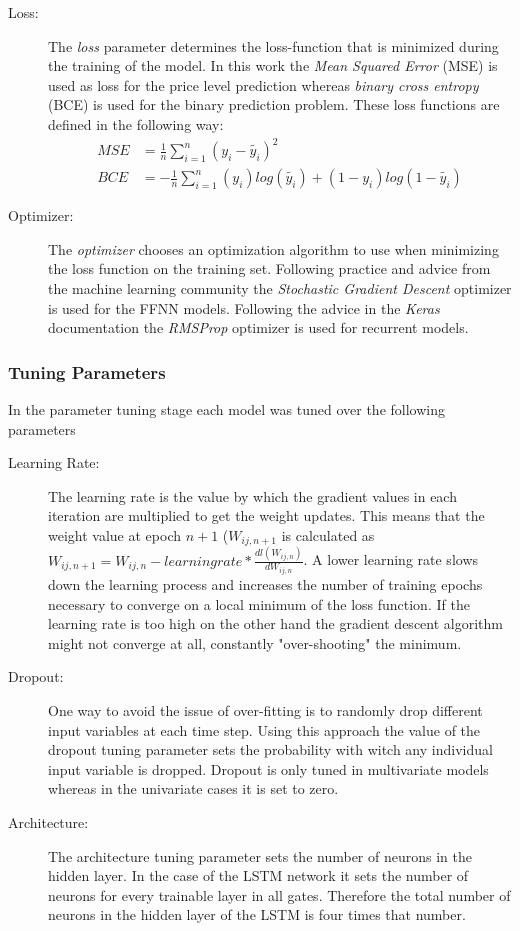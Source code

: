 \begin{description}
\item[Loss:] The \textit{loss} parameter determines the loss-function that is minimized during the training of the model. In this work the \textit{Mean Squared Error} (MSE) is used as loss for the price level prediction whereas \textit{binary cross entropy} (BCE) is used for the binary prediction problem. These loss functions are defined in the following way: \begin{align*}
MSE &= \frac{1}{n}\sum_{i=1}^{n}(y_i - \tilde{y_i})^2 \\
BCE &= -\frac{1}{n}\sum_{i=1}^{n}(y_i)log(\tilde{y_i}) + (1-y_i)log(1-\tilde{y_i})
\end{align*}

\item[Optimizer:] The \textit{optimizer} chooses an optimization algorithm to use when minimizing the loss function on the training set. Following practice and advice from the machine learning community the \textit{Stochastic Gradient Descent} optimizer is used for the FFNN models. Following the advice in the \textit{Keras} documentation the \textit{RMSProp} optimizer is used for recurrent models.
\end{description}
\subsubsection{Tuning Parameters}
In the parameter tuning stage each model was tuned over the following parameters
\begin{description}
\item[Learning Rate:] The learning rate is the value by which the gradient values in each iteration are multiplied to get the weight updates. This means that the weight value at epoch $n+1$ ($W_{ij, n+1}$ is calculated as $W_{ij, n+1} = W_{ij, n} - learningrate * \frac{dl(W_{ij, n})}{dW_{ij, n}}$. A lower learning rate slows down the learning process and increases the number of training epochs necessary to converge on a local minimum of the loss function. If the learning rate is too high on the other hand the gradient descent algorithm might not converge at all, constantly "over-shooting" the minimum.
\item[Dropout:] One way to avoid the issue of over-fitting is to randomly drop different input variables at each time step. Using this approach the value of the dropout tuning parameter sets the probability with witch any individual input variable is dropped. Dropout is only tuned in multivariate models whereas in the univariate cases it is set to zero.
\item[Architecture:] The architecture tuning parameter sets the number of neurons in the hidden layer. In the case of the LSTM network it sets the number of neurons for every trainable layer in all gates. Therefore the total number of neurons in the hidden layer of the LSTM is four times that number.
\end{description}
